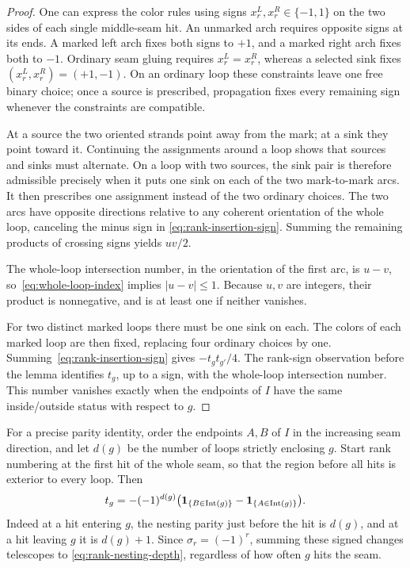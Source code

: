 \begin{proof}
One can express the color rules using signs $x_r^L,x_r^R\in\{-1,1\}$
on the two sides of each single middle-seam hit.  An unmarked arch
requires opposite signs at its ends.  A marked left arch fixes both
signs to $+1$, and a marked right arch fixes both to $-1$.  Ordinary
seam gluing requires $x_r^L=x_r^R$, whereas a selected sink fixes
$(x_r^L,x_r^R)=(+1,-1)$.  On an ordinary loop these constraints leave
one free binary choice; once a source is prescribed, propagation fixes
every remaining sign whenever the constraints are compatible.

At a source the two oriented strands point away from the mark;
at a sink they point toward it.  Continuing the assignments around a
loop shows that sources and sinks must alternate.  On a loop with two
sources, the sink pair is therefore admissible precisely when it puts
one sink on each of the two mark-to-mark arcs.  It then prescribes one
assignment instead of the two ordinary choices.  The two arcs have
opposite directions relative to any coherent orientation of the
whole loop, canceling the minus sign in
\eqref{eq:rank-insertion-sign}.  Summing the remaining products of
crossing signs yields $uv/2$.

The whole-loop intersection number, in the orientation of the first
arc, is $u-v$, so~\eqref{eq:whole-loop-index} implies $|u-v|\le1$.
Because $u,v$ are integers, their product is nonnegative, and is at
least one if neither vanishes.

For two distinct marked loops there must be one sink on each.  The
colors of each marked loop are then fixed, replacing four ordinary
choices by one.  Summing~\eqref{eq:rank-insertion-sign} gives
$-t_gt_{g'}/4$.  The rank-sign observation before the lemma identifies
$t_g$, up to a sign, with the whole-loop intersection number.  This
number vanishes exactly when the endpoints of $I$ have the same
inside/outside status with respect to $g$.
\end{proof}

For a precise parity identity, order the endpoints $A,B$ of $I$ in the
increasing seam direction, and let $d(g)$ be the number of loops strictly
enclosing $g$.  Start rank numbering at the first hit of the whole seam,
so that the region before all hits is exterior to every loop.  Then
\begin{equation}
 t_g=-(-1)^{d(g)}
 \bigl(\mathbf 1_{\{B\in\operatorname{Int}(g)\}}
       -\mathbf 1_{\{A\in\operatorname{Int}(g)\}}\bigr).
 \label{eq:rank-nesting-depth}
\end{equation}
Indeed at a hit entering $g$, the nesting parity just before the hit is
$d(g)$, and at a hit leaving $g$ it is $d(g)+1$.  Since
$\sigma_r=(-1)^r$, summing these signed changes telescopes to
\eqref{eq:rank-nesting-depth}, regardless of how often $g$ hits the seam.

